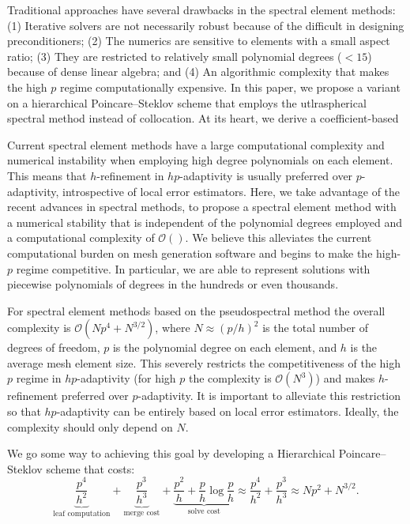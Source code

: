 \documentclass[11pt,a4paper,review]{siamart171218}
\begin{document}
Traditional approaches have several drawbacks in the spectral element methods: (1) Iterative solvers are not necessarily robust because of the difficult in designing preconditioners; 
(2) The numerics are sensitive to elements with a small aspect ratio; (3) They are restricted to relatively small polynomial degrees ($<15$) because of dense linear algebra; and (4) An algorithmic complexity that makes the high $p$ regime computationally expensive. In this paper, we propose a variant on a hierarchical Poincare--Steklov scheme that employs the utlraspherical spectral method instead of collocation. At its heart, we derive a coefficient-based 




 
Current spectral element methods have a large computational complexity and numerical instability when employing high degree polynomials on each element. This means that $h$-refinement in $hp$-adaptivity is usually preferred over $p$-adaptivity, introspective of local error estimators. Here, we take advantage of the recent advances in spectral methods, to propose a spectral element method with a numerical stability that is independent of the polynomial degrees employed and a computational complexity of $\mathcal{O}()$. We believe this alleviates the current computational burden on mesh generation software and begins to make the high-$p$ regime competitive. In particular, we are able to represent solutions with piecewise polynomials of degrees in the hundreds or even thousands. 


For spectral element methods based on the pseudospectral method the overall complexity is $\mathcal{O}(Np^4 + N^{3/2})$, where $N \approx (p/h)^2$ is the total number of degrees of freedom, $p$ is the polynomial degree on each element, and $h$ is the average mesh element size. This  severely restricts the competitiveness of the high $p$ regime in $hp$-adaptivity (for high $p$ the complexity is $\mathcal{O}(N^3)$) and makes $h$-refinement preferred over $p$-adaptivity. It is important to alleviate this restriction so that $hp$-adaptivity can be entirely based on local error estimators. Ideally, the complexity should only depend on $N$.

We go some way to achieving this goal by developing a Hierarchical Poincare--Steklov scheme that costs:
\[
 \underbrace{\frac{p^4}{h^2}}_{\text{leaf computation}} + \underbrace{\frac{p^3}{h^3}}_{\text{merge cost}} + \underbrace{\frac{p^2}{h} + \frac{p}{h}\log \frac{p}{h}}_{\text{solve cost}} \approx \frac{p^4}{h^2} + \frac{p^3}{h^3} \approx Np^2 + N^{3/2}. 
\]
\end{document}
